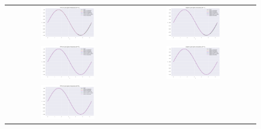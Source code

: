 \documentclass[a4paper]{article}
\begin{document}
\begin{sloppypar}
\begin{figure}[H]
  \centering
  \begin{tabular}{cc}
    \includegraphics[width=0.45\textwidth]{../figure/test/PPForm3_N11.png} &
    \includegraphics[width=0.45\textwidth]{../figure/test/BSpline3_N11.png}  \\
    \includegraphics[width=0.45\textwidth]{../figure/test/PPForm3_N41.png} &
    \includegraphics[width=0.45\textwidth]{../figure/test/BSpline3_N41.png}  \\
    \includegraphics[width=0.45\textwidth]{../figure/test/PPForm3_N91.png} &

\end{tabular}
\end{figure}
\end{sloppypar}
\end{document}
